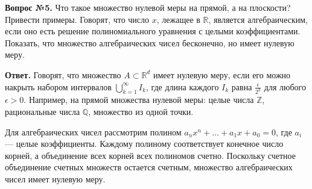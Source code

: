 \documentclass[12pt, a4paper]{article}
\begin{document}
\textbf{Вопрос №5.} Что такое множество нулевой меры на прямой, а на плоскости? Привести примеры. Говорят, что число $x$, лежащее в $\mathbb{R}$, является алгебраическим, если оно есть решение полиномиального уравнения с целыми коэффициентами. Показать, что множество алгебраических чисел бесконечно, но имеет нулевую меру.



\vspace{2em}



\textbf{Ответ.} Говорят, что множество $A \subset \mathbb{R}^d$ имеет нулевую меру, если его можно накрыть набором интервалов $\bigcup_{k=1}^\infty I_k$, где длина каждого $I_k$ равна $\frac{\epsilon}{2^k}$ для любого $\epsilon > 0$. Например, на прямой множества нулевой меры: целые числа $\mathbb{Z}$, рациональные числа $\mathbb{Q}$, множество из одной точки.



\vspace{2em}



Для алгебраических чисел рассмотрим полином $a_n x^n + \dots + a_1 x + a_0 = 0$, где $a_i$ — целые коэффициенты. Каждому полиному соответствует конечное число корней, а объединение всех корней всех полиномов счетно. Поскольку счетное объединение счетных множеств остается счетным, множество алгебраических чисел имеет нулевую меру.
\end{document}
